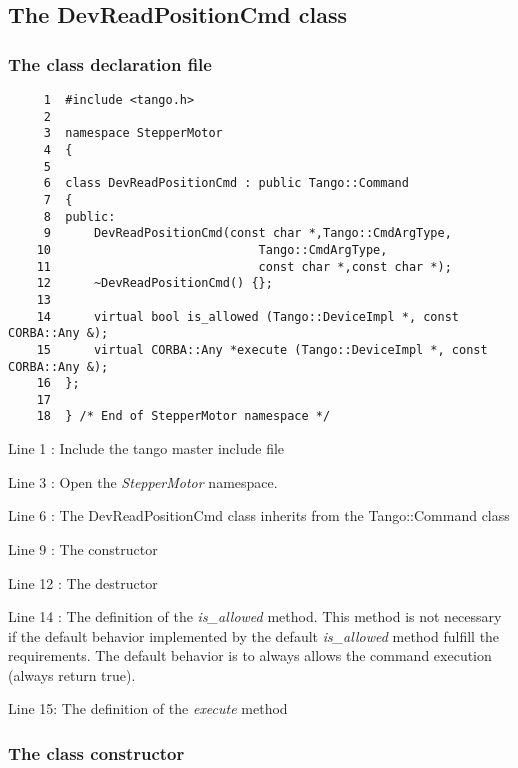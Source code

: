 \subsection{The DevReadPositionCmd class}


\subsubsection{The class declaration file}


\begin{verbatim}
     1  #include <tango.h>
     2  
     3  namespace StepperMotor
     4  {
     5  
     6  class DevReadPositionCmd : public Tango::Command
     7  {
     8  public:
     9      DevReadPositionCmd(const char *,Tango::CmdArgType,
    10                             Tango::CmdArgType,
    11                             const char *,const char *);
    12      ~DevReadPositionCmd() {};
    13          
    14      virtual bool is_allowed (Tango::DeviceImpl *, const CORBA::Any &);
    15      virtual CORBA::Any *execute (Tango::DeviceImpl *, const CORBA::Any &);
    16  };
    17  
    18  } /* End of StepperMotor namespace */
\end{verbatim}


Line 1 : Include the tango master include file

Line 3 : Open the \emph{StepperMotor} namespace.

Line 6 : The DevReadPositionCmd class inherits from the Tango::Command
class

Line 9 : The constructor

Line 12 : The destructor

Line 14 : The definition of the \emph{is\_allowed}
method. This method is not necessary if the default behavior implemented
by the default \emph{is\_allowed} method fulfill the requirements.
The default behavior is to always allows the command execution (always
return true).

Line 15: The definition of the \emph{execute} method


\subsubsection{The class constructor}

